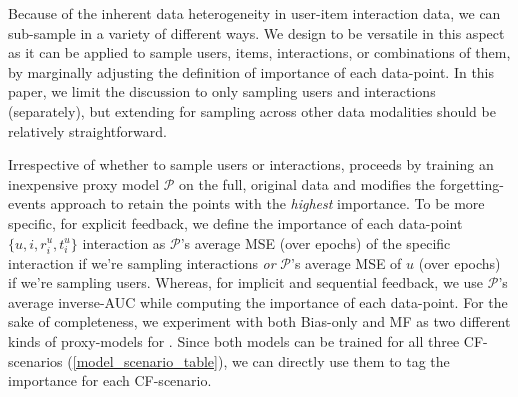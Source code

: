 Because of the inherent data heterogeneity in user-item interaction data, we can sub-sample in a variety of different ways. We design \sampler to be versatile in this aspect as it can be applied to sample users, items, interactions, or combinations of them, by marginally adjusting the definition of importance of each data-point. In this paper, we limit the discussion to only sampling users and interactions (separately), but extending \sampler for sampling across other data modalities should be relatively straightforward.

Irrespective of whether to sample users or interactions, \sampler proceeds by training an inexpensive proxy model $\mathcal{P}$ on the full, original data \dataset and modifies the forgetting-events approach \cite{forgetting_events} to retain the points with the \emph{highest} importance. To be more specific, for explicit feedback, we define the importance of each data-point \ie $\{u, i, r^u_i, t^u_i\}$ interaction as $\mathcal{P}$'s average MSE (over epochs) of the specific interaction if we're sampling interactions \emph{or} $\mathcal{P}$'s average MSE of $u$ (over epochs) if we're sampling users. Whereas, for implicit and sequential feedback, we use $\mathcal{P}$'s average inverse-AUC while computing the importance of each data-point. For the sake of completeness, we experiment with both Bias-only and MF as two different kinds of proxy-models for \sampler. Since both models can be trained for all three CF-scenarios (\cref{model_scenario_table}), we can directly use them to tag the importance for each CF-scenario.

